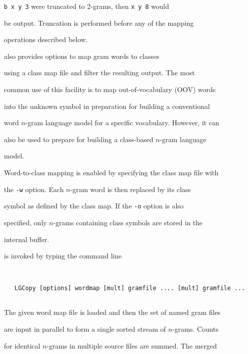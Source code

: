 \texttt{b x y 3} were truncated to 2-grams, then \texttt{x y 8} would


be output. Truncation is performed before any of the mapping


operations described below.





 also provides options to map gram words to classes


using a class map file and filter the resulting output.  The most


common use of this facility is to map out-of-vocabulary (OOV) words


into the unknown symbol in preparation for building a conventional


word $n$-gram language model for a specific vocabulary.  However, it can


also be used to prepare for building a class-based $n$-gram language


model.





Word-to-class mapping is enabled by specifying the class map file with


the \texttt{-w} option. Each $n$-gram word is then replaced by its class


symbol as defined by the class map. If the \texttt{-o} option is also


specified, only $n$-grams containing class symbols are stored in the 


internal buffer.










 is invoked by typing the command line


\begin{verbatim}


   LGCopy [options] wordmap [mult] gramfile .... [mult] gramfile ...


\end{verbatim}


The given word map file is loaded and then the set of named gram files


are input in parallel to form a single sorted stream of $n$-grams. Counts


for identical $n$-grams in multiple source files are summed.  The merged


